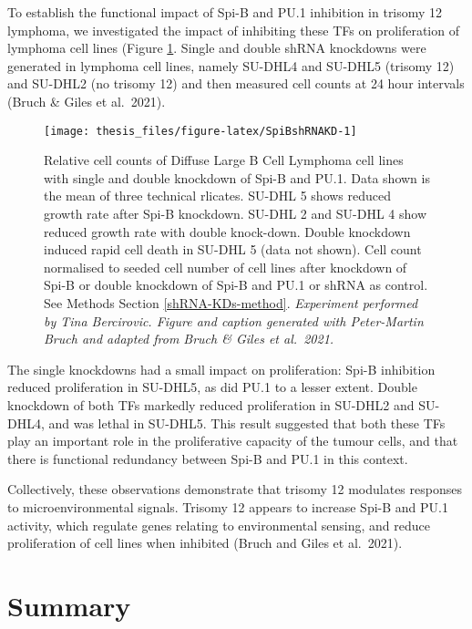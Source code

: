 \documentclass[11pt, a4paper, twosided]{book}
\begin{document}
To establish the functional impact of Spi-B and PU.1 inhibition in trisomy 12 lymphoma, we investigated the impact of inhibiting these TFs on proliferation of lymphoma cell lines (Figure \ref{fig:SpiBshRNAKD}. Single and double shRNA knockdowns were generated in lymphoma cell lines, namely SU-DHL4 and SU-DHL5 (trisomy 12) and SU-DHL2 (no trisomy 12) and then measured cell counts at 24 hour intervals (Bruch \& Giles et al.~2021).


\begin{figure}

{\centering \texttt{[image: thesis\_files/figure-latex/SpiBshRNAKD-1]} 

}

\caption{Relative cell counts of Diffuse Large B Cell Lymphoma cell lines with single and double knockdown of Spi-B and PU.1. Data shown is the mean of three technical rlicates. SU-DHL 5 shows reduced growth rate after Spi-B knockdown. SU-DHL 2 and SU-DHL 4 show reduced growth rate with double knock-down. Double knockdown induced rapid cell death in SU-DHL 5 (data not shown). Cell count normalised to seeded cell number of cell lines after knockdown of Spi-B or double knockdown of Spi-B and PU.1 or shRNA as control. See Methods Section \ref{shRNA-KDs-method}. \emph{Experiment performed by Tina Bercirovic. Figure and caption generated with Peter-Martin Bruch and adapted from Bruch \& Giles et al.~2021.}}\label{fig:SpiBshRNAKD}
\end{figure}
The single knockdowns had a small impact on proliferation: Spi-B inhibition reduced proliferation in SU-DHL5, as did PU.1 to a lesser extent. Double knockdown of both TFs markedly reduced proliferation in SU-DHL2 and SU-DHL4, and was lethal in SU-DHL5. This result suggested that both these TFs play an important role in the proliferative capacity of the tumour cells, and that there is functional redundancy between Spi-B and PU.1 in this context.

Collectively, these observations demonstrate that trisomy 12 modulates responses to microenvironmental signals. Trisomy 12 appears to increase Spi-B and PU.1 activity, which regulate genes relating to environmental sensing, and reduce proliferation of cell lines when inhibited (Bruch and Giles et al.~2021).

\hypertarget{summary-1}{%
\section{Summary}\label{summary-1}}
\end{document}

